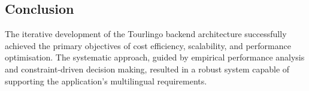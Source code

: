 \subsection{Conclusion}

The iterative development of the Tourlingo backend architecture successfully achieved the primary objectives of cost efficiency, scalability, and performance optimisation. The systematic approach, guided by empirical performance analysis and constraint-driven decision making, resulted in a robust system capable of supporting the application's multilingual requirements.




